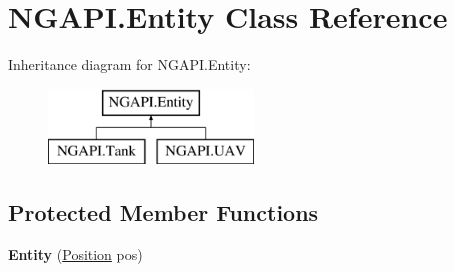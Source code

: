 \hypertarget{class_n_g_a_p_i_1_1_entity}{}\section{N\+G\+A\+P\+I.\+Entity Class Reference}
\label{class_n_g_a_p_i_1_1_entity}
Inheritance diagram for N\+G\+A\+P\+I.\+Entity\+:\begin{figure}[H]
\begin{center}
\leavevmode
\includegraphics[height=2.000000cm]{class_n_g_a_p_i_1_1_entity}
\end{center}
\end{figure}
\subsection*{Protected Member Functions}
\begin{DoxyCompactItemize}
\item 
\mbox{\label{class_n_g_a_p_i_1_1_entity_aa707e290581c0daecc6ee82d252f882f}} 
{\bfseries Entity} (\hyperlink{struct_n_g_a_p_i_1_1_position}{Position} pos)
\end{DoxyCompactItemize}
